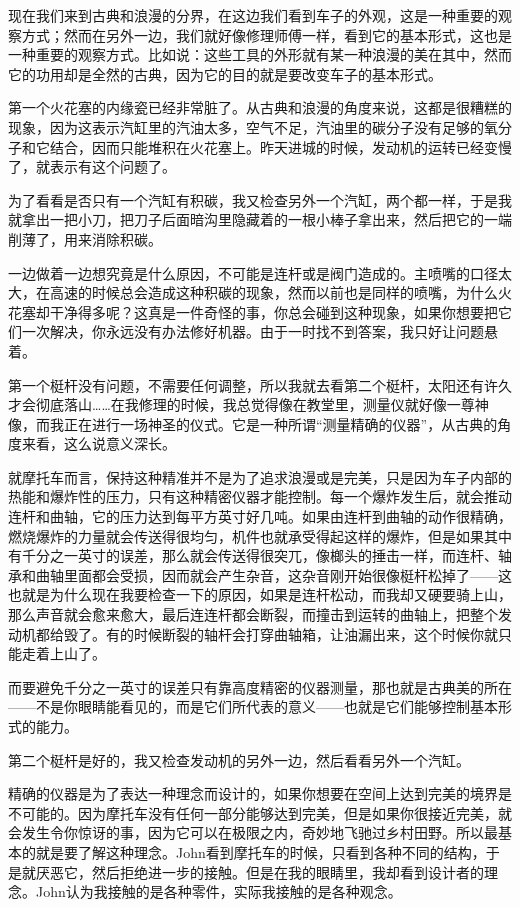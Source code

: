 \documentclass[UTF8]{article}
\begin{document}
\par 现在我们来到古典和浪漫的分界，在这边我们看到车子的外观，这是一种重要的观察方式；然而在另外一边，我们就好像修理师傅一样，看到它的基本形式，这也是一种重要的观察方式。比如说：这些工具的外形就有某一种浪漫的美在其中，然而它的功用却是全然的古典，因为它的目的就是要改变车子的基本形式。
\par 第一个火花塞的内缘瓷已经非常脏了。从古典和浪漫的角度来说，这都是很糟糕的现象，因为这表示汽缸里的汽油太多，空气不足，汽油里的碳分子没有足够的氧分子和它结合，因而只能堆积在火花塞上。昨天进城的时候，发动机的运转已经变慢了，就表示有这个问题了。
\par 为了看看是否只有一个汽缸有积碳，我又检查另外一个汽缸，两个都一样，于是我就拿出一把小刀，把刀子后面暗沟里隐藏着的一根小棒子拿出来，然后把它的一端削薄了，用来消除积碳。
\par 一边做着一边想究竟是什么原因，不可能是连杆或是阀门造成的。主喷嘴的口径太大，在高速的时候总会造成这种积碳的现象，然而以前也是同样的喷嘴，为什么火花塞却干净得多呢？这真是一件奇怪的事，你总会碰到这种现象，如果你想要把它们一次解决，你永远没有办法修好机器。由于一时找不到答案，我只好让问题悬着。
\par 第一个梃杆没有问题，不需要任何调整，所以我就去看第二个梃杆，太阳还有许久才会彻底落山……在我修理的时候，我总觉得像在教堂里，测量仪就好像一尊神像，而我正在进行一场神圣的仪式。它是一种所谓“测量精确的仪器”，从古典的角度来看，这么说意义深长。
\par 就摩托车而言，保持这种精准并不是为了追求浪漫或是完美，只是因为车子内部的热能和爆炸性的压力，只有这种精密仪器才能控制。每一个爆炸发生后，就会推动连杆和曲轴，它的压力达到每平方英寸好几吨。如果由连杆到曲轴的动作很精确，燃烧爆炸的力量就会传送得很均匀，机件也就承受得起这样的爆炸，但是如果其中有千分之一英寸的误差，那么就会传送得很突兀，像榔头的捶击一样，而连杆、轴承和曲轴里面都会受损，因而就会产生杂音，这杂音刚开始很像梃杆松掉了——这也就是为什么现在我要检查一下的原因，如果是连杆松动，而我却又硬要骑上山，那么声音就会愈来愈大，最后连连杆都会断裂，而撞击到运转的曲轴上，把整个发动机都给毁了。有的时候断裂的轴杆会打穿曲轴箱，让油漏出来，这个时候你就只能走着上山了。
\par 而要避免千分之一英寸的误差只有靠高度精密的仪器测量，那也就是古典美的所在——不是你眼睛能看见的，而是它们所代表的意义——也就是它们能够控制基本形式的能力。
\par 第二个梃杆是好的，我又检查发动机的另外一边，然后看看另外一个汽缸。
\par 精确的仪器是为了表达一种理念而设计的，如果你想要在空间上达到完美的境界是不可能的。因为摩托车没有任何一部分能够达到完美，但是如果你很接近完美，就会发生令你惊讶的事，因为它可以在极限之内，奇妙地飞驰过乡村田野。所以最基本的就是要了解这种理念。John看到摩托车的时候，只看到各种不同的结构，于是就厌恶它，然后拒绝进一步的接触。但是在我的眼睛里，我却看到设计者的理念。John认为我接触的是各种零件，实际我接触的是各种观念。
\end{document}
